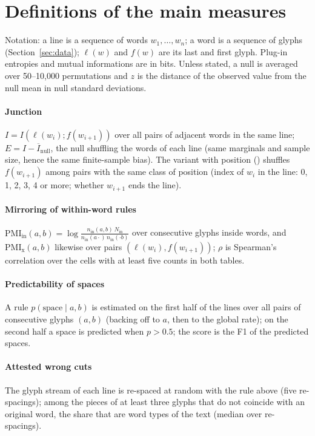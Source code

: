 \appendix

\section{Definitions of the main measures}
\label{app:measures}

Notation: a line is a sequence of words $w_1,\dots,w_n$; a word is a sequence of glyphs (Section~\ref{sec:data}); $\ell(w)$
and $f(w)$ are its last and first glyph. Plug-in entropies and mutual informations are in bits. Unless stated, a null is
averaged over 50--10{,}000 permutations and $z$ is the distance of the observed value from the null mean in null standard
deviations.

\paragraph{Junction} $I = I(\ell(w_i); f(w_{i+1}))$ over all pairs of adjacent words in the same line; $E = I -
\overline{I}_{\text{null}}$, the null shuffling the words of each line (same marginals and sample size, hence the same
finite-sample bias). The variant with position () shuffles $f(w_{i+1})$ among pairs with the same class of
position (index of $w_i$ in the line: 0, 1, 2, 3, 4 or more; whether $w_{i+1}$ ends the line).

\paragraph{Mirroring of within-word rules} $\mathrm{PMI}_{\text{in}}(a,b) = \log \frac{n_{\text{in}}(a,b)\,N_{\text{in}}}
{n_{\text{in}}(a\cdot)\,n_{\text{in}}(\cdot b)}$ over consecutive glyphs inside words, and $\mathrm{PMI}_{\text{x}}(a,b)$
likewise over pairs $(\ell(w_i), f(w_{i+1}))$; $\rho$ is Spearman's correlation over the cells with at least five counts in
both tables.

\paragraph{Predictability of spaces} A rule $p(\text{space}\mid a,b)$ is estimated on the first half of the lines over
all pairs of consecutive glyphs $(a,b)$ (backing off to $a$, then to the global rate); on the second half a space is
predicted when $p > 0.5$; the score is the F1 of the predicted spaces.

\paragraph{Attested wrong cuts} The glyph stream of each line is re-spaced at random with the rule above (five
re-spacings); among the pieces of at least three glyphs that do not coincide with an original word, the share that are
word types of the text (median over re-spacings).


